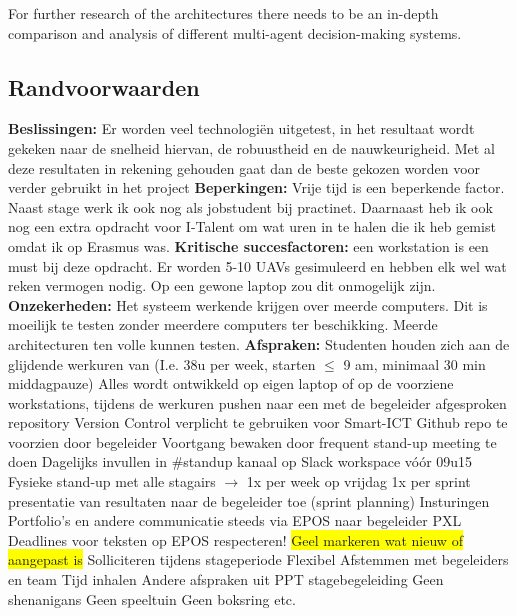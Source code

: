   For further research of the architectures there needs to be an in-depth comparison and analysis of different multi-agent decision-making systems.
\newpage

\subsection{Randvoorwaarden}
  \begin{outline}
    \1 \textbf{Beslissingen:}
      \2[] Er worden veel technologiën uitgetest, in het resultaat wordt gekeken naar de snelheid hiervan, de robuustheid en de nauwkeurigheid. Met al deze resultaten in rekening gehouden gaat dan de beste gekozen worden voor verder gebruikt in het project
    \1 \textbf{Beperkingen:}
      \2[] Vrije tijd is een beperkende factor. Naast stage werk ik ook nog als jobstudent bij practinet. Daarnaast heb ik ook nog een extra opdracht voor I-Talent om wat uren in te halen die ik heb gemist omdat ik op Erasmus was.
    \1 \textbf{Kritische succesfactoren:}
      \2[] een workstation is een must bij deze opdracht. Er worden 5-10 UAVs gesimuleerd en hebben elk wel wat reken vermogen nodig. Op een gewone laptop zou dit onmogelijk zijn.
    \1 \textbf{Onzekerheden:}
      \2[] Het systeem werkende krijgen over meerde computers. Dit is moeilijk te testen zonder meerdere computers ter beschikking. Meerde architecturen ten volle kunnen testen.
    \1 \textbf{Afspraken:}
      \2 Studenten houden zich aan de glijdende werkuren van \stagebedrijf{} (I.e. 38u per week, starten $\leq$ 9 am, minimaal 30 min middagpauze)
      \2 Alles wordt ontwikkeld op eigen laptop of op de voorziene workstations, tijdens de werkuren pushen naar een met de begeleider afgesproken repository
        \3 Version Control verplicht te gebruiken voor Smart-ICT
        \3 Github repo te voorzien door begeleider
      \2 Voortgang bewaken door frequent stand-up meeting te doen
        \3 Dagelijks invullen in $\#$standup kanaal op Slack workspace vóór 09u15
        \3 Fysieke stand-up met alle stagairs $\rightarrow$ 1x per week op vrijdag
      \2 1x per sprint presentatie van resultaten naar de begeleider toe (sprint planning)
      \2 Insturingen
        \3 Portfolio’s en andere communicatie steeds via EPOS naar begeleider PXL 
        \3 Deadlines voor teksten op EPOS respecteren! 
        \3 \colorbox{yellow}{Geel markeren wat nieuw of aangepast is}
      \2 Solliciteren tijdens stageperiode
        \3 Flexibel
        \3 Afstemmen met begeleiders en team
        \3 Tijd inhalen
        \3 Andere afspraken uit PPT stagebegeleiding
      \2 Geen shenanigans
        \3 Geen speeltuin
        \3 Geen boksring
        \3 etc.
  \end{outline}

\newpage